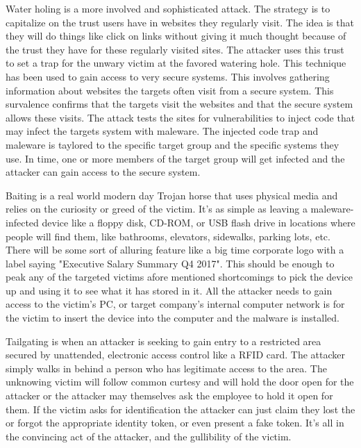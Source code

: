 Water holing is a more involved and sophisticated attack. The strategy is to capitalize on the trust users have in websites they regularly visit. The idea is that they
will do things like click on links without giving it much thought because of the trust they have for these regularly visited sites. The attacker uses this trust to set
a trap for the unwary victim at the favored watering hole. This technique has been used to gain access to very secure systems. This involves gathering information about
websites the targets often visit from a secure system. This survalence confirms that the targets visit the websites and that the secure system allows these visits. The
attack tests the sites for vulnerabilities to inject code that may infect the targets system with maleware. The injected code trap and maleware is taylored to the
specific target group and the specific systems they use. In time, one or more members of the target group will get infected and the attacker can gain access to the
secure system.

Baiting is a real world modern day Trojan horse that uses physical media and relies on the curiosity or greed of the victim. It's as simple as leaving a maleware-infected
device like a floppy disk, CD-ROM, or USB flash drive in locations where people will find them, like bathrooms, elevators, sidewalks, parking lots, etc. There will be
some sort of alluring feature like a big time corporate logo with a label saying "Executive Salary Summary Q4 2017". This should be enough to peak any of the targeted 
victims afore mentioned shortcomings to pick the device up and using it to see what it has stored in it. All the attacker needs to gain access to the victim's PC, or 
target company's internal computer network is for the victim to insert the device into the computer and the malware is installed.

Tailgating is when an attacker is seeking to gain entry to a restricted area secured by unattended, electronic access control like a RFID card. The attacker simply walks
in behind a person who has legitimate access to the area. The unknowing victim will follow common curtesy and will hold the door open for the attacker or the attacker may
themselves ask the employee to hold it open for them. If the victim asks for identification the attacker can just claim they lost the or forgot the appropriate identity
token, or even present a fake token. It's all in the convincing act of the attacker, and the gullibility of the victim.